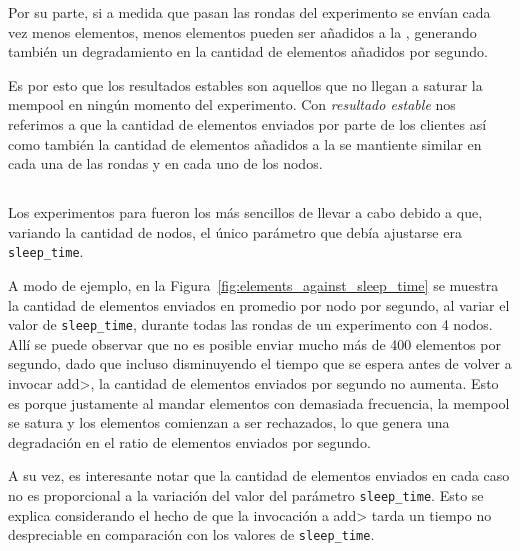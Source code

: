 Por su parte, si a medida que pasan las rondas del experimento se envían cada vez menos elementos, menos elementos pueden ser
añadidos a la \setchain, generando también un degradamiento en la cantidad de elementos añadidos por segundo.

Es por esto que los resultados estables son aquellos que no llegan a saturar la mempool en ningún momento del
experimento. Con \textit{resultado estable} nos referimos a que la cantidad de elementos enviados por parte de
los clientes así como también la cantidad de elementos añadidos a la \setchain se mantiente similar en cada
una de las rondas y en cada uno de los nodos.

\subsection{\vanilla}
Los experimentos para \vanilla fueron los más sencillos de llevar a cabo debido a que, variando la cantidad de nodos,
el único parámetro que debía ajustarse era \texttt{sleep\_time}.

A modo de ejemplo, en la Figura~\ref{fig:elements_against_sleep_time} se muestra la cantidad de elementos enviados en promedio por nodo por segundo,
al variar el valor de \texttt{sleep\_time}, durante todas las rondas de un experimento con 4 nodos.
Allí se puede observar que no es posible enviar mucho más de 400 elementos por segundo, dado que incluso disminuyendo el tiempo
que se espera antes de volver a invocar \<add>, la cantidad de elementos enviados por segundo no aumenta.
Esto es porque justamente al mandar elementos con demasiada frecuencia, la mempool se satura y los elementos comienzan a ser
rechazados, lo que genera una degradación en el ratio de elementos enviados por segundo.

A su vez, es interesante notar que la cantidad de elementos enviados en cada caso no es proporcional a la variación del valor del
parámetro \texttt{sleep\_time}.
Esto se explica considerando el hecho de que la invocación a \<add> tarda un tiempo no despreciable en comparación con
los valores de \texttt{sleep\_time}.

